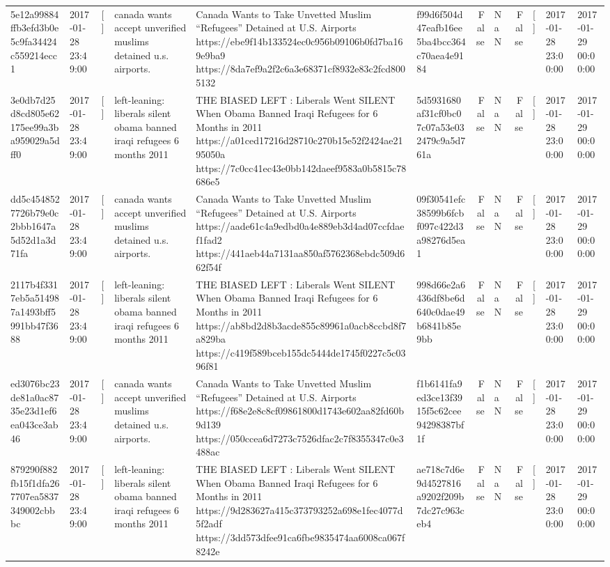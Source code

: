 \begin{tabular}{llllllrlrlll}
5e12a99884ffb3efd3b0e5c9fa34424c559214ecc1 & 2017-01-28 23:49:00 & [] & canada wants accept unverified muslims detained u.s. airports. & Canada Wants to Take Unvetted Muslim “Refugees” Detained at U.S. Airports https://ebe9f14b133524ec0c956b09106b0fd7ba169e9ba9 https://8da7ef9a2f2c6a3e68371cf8932e83c2fcd8005132 & f99d6f504d47eafb16ee5ba4bcc364c70aea4e9184 & False & NaN & False & [] & 2017-01-28 23:00:00 & 2017-01-29 00:00:00 \\
3e0db7d25d8cd805e62175ee99a3ba959029a5dff0 & 2017-01-28 23:49:00 & [] & left-leaning: liberals silent obama banned iraqi refugees 6 months 2011 & THE BIASED LEFT : Liberals Went SILENT When Obama Banned Iraqi Refugees for 6 Months in 2011 https://a01ced17216d28710c270b15e52f2424ae2195050a https://7c0cc41ec43e0bb142daeef9583a0b5815c78686e5 & 5d5931680af31cf0bc07c07a53e032479c9a5d761a & False & NaN & False & [] & 2017-01-28 23:00:00 & 2017-01-29 00:00:00 \\
dd5c4548527726b79e0c2bbb1647a5d52d1a3d71fa & 2017-01-28 23:49:00 & [] & canada wants accept unverified muslims detained u.s. airports. & Canada Wants to Take Unvetted Muslim “Refugees” Detained at U.S. Airports https://aade61c4a9edbd0a4e889eb3d4ad07ccfdaef1fad2 https://441aeb44a7131aa850af5762368ebdc509d662f54f & 09f30541efc38599b6fcbf097c422d3a98276d5ea1 & False & NaN & False & [] & 2017-01-28 23:00:00 & 2017-01-29 00:00:00 \\
2117b4f3317eb5a514987a1493bff5991bb47f3688 & 2017-01-28 23:49:00 & [] & left-leaning: liberals silent obama banned iraqi refugees 6 months 2011 & THE BIASED LEFT : Liberals Went SILENT When Obama Banned Iraqi Refugees for 6 Months in 2011 https://ab8bd2d8b3acde855c89961a0acb8ccbd8f7a829ba https://c419f589bceb155dc5444de1745f0227c5c0396f81 & 998d66e2a6436df8be6d640c0dae49b6841b85e9bb & False & NaN & False & [] & 2017-01-28 23:00:00 & 2017-01-29 00:00:00 \\
ed3076bc23de81a0ac8735e23d1ef6ea043ce3ab46 & 2017-01-28 23:49:00 & [] & canada wants accept unverified muslims detained u.s. airports. & Canada Wants to Take Unvetted Muslim “Refugees” Detained at U.S. Airports https://f68e2e8c8cf09861800d1743e602aa82fd60b9d139 https://050ccea6d7273c7526dfac2c7f8355347c0e3488ac & f1b6141fa9ed3ce13f3915f5c62cee94298387bf1f & False & NaN & False & [] & 2017-01-28 23:00:00 & 2017-01-29 00:00:00 \\
879290f882fb15f1dfa267707ea5837349002cbbbc & 2017-01-28 23:49:00 & [] & left-leaning: liberals silent obama banned iraqi refugees 6 months 2011 & THE BIASED LEFT : Liberals Went SILENT When Obama Banned Iraqi Refugees for 6 Months in 2011 https://9d283627a415c373793252a698e1fec4077d5f2adf https://3dd573dfee91ca6fbe9835474aa6008ca067f8242e & ae718c7d6e9d4527816a9202f209b7dc27c963ceb4 & False & NaN & False & [] & 2017-01-28 23:00:00 & 2017-01-29 00:00:00 \\

\end{tabular}
